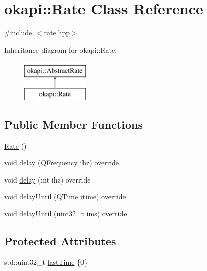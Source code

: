 \hypertarget{classokapi_1_1Rate}{}\section{okapi\+::Rate Class Reference}
\label{classokapi_1_1Rate}


{\ttfamily \#include $<$rate.\+hpp$>$}

Inheritance diagram for okapi\+::Rate\+:\begin{figure}[H]
\begin{center}
\leavevmode
\includegraphics[height=2.000000cm]{classokapi_1_1Rate}
\end{center}
\end{figure}
\subsection*{Public Member Functions}
\begin{DoxyCompactItemize}
\item 
\mbox{\hyperlink{classokapi_1_1Rate_af6bc24e88c99cb3ba9b5384c80b13645}{Rate}} ()
\item 
void \mbox{\hyperlink{classokapi_1_1Rate_ad066b6b32b6d43f4ccbb66617018e1fc}{delay}} (Q\+Frequency ihz) override
\item 
void \mbox{\hyperlink{classokapi_1_1Rate_a302ef2dc3cece68cd0125934c71936cc}{delay}} (int ihz) override
\item 
void \mbox{\hyperlink{classokapi_1_1Rate_a9244a301c81388054954076b739cec50}{delay\+Until}} (Q\+Time itime) override
\item 
void \mbox{\hyperlink{classokapi_1_1Rate_a0d31416c85408d63830cceaa07aff1e0}{delay\+Until}} (uint32\+\_\+t ims) override
\end{DoxyCompactItemize}
\subsection*{Protected Attributes}
\begin{DoxyCompactItemize}
\item 
std\+::uint32\+\_\+t \mbox{\hyperlink{classokapi_1_1Rate_aec1dbde3c1139531b48a035e9041e61b}{last\+Time}} \{0\}
\end{DoxyCompactItemize}


